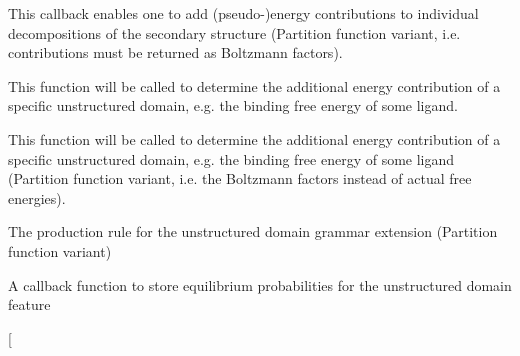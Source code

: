 \begin{DoxyRefList}
\item[\label{callbacks__callbacks000003}%
\Hypertarget{callbacks__callbacks000003}%
Global \mbox{\hyperlink{group__soft__constraints_ga4099978d410513edeeff8f3db13144c5}{vrna\+\_\+callback\+\_\+sc\+\_\+exp\+\_\+energy}} (int i, int j, int k, int l, unsigned char d, void $\ast$data)]This callback enables one to add (pseudo-\/)energy contributions to individual decompositions of the secondary structure (Partition function variant, i.\+e. contributions must be returned as Boltzmann factors).  
\item[\label{callbacks__callbacks000010}%
\Hypertarget{callbacks__callbacks000010}%
Global \mbox{\hyperlink{group__domains__up_ga75825c57d0bfde4ae4f95c044260c5c3}{vrna\+\_\+callback\+\_\+ud\+\_\+energy}} (vrna\+\_\+fold\+\_\+compound\+\_\+t $\ast$vc, int i, int j, unsigned int loop\+\_\+type, void $\ast$data)]This function will be called to determine the additional energy contribution of a specific unstructured domain, e.\+g. the binding free energy of some ligand.  
\item[\label{callbacks__callbacks000011}%
\Hypertarget{callbacks__callbacks000011}%
Global \mbox{\hyperlink{group__domains__up_ga861706f257ba993753464b823e65b86e}{vrna\+\_\+callback\+\_\+ud\+\_\+exp\+\_\+energy}} (vrna\+\_\+fold\+\_\+compound\+\_\+t $\ast$vc, int i, int j, unsigned int loop\+\_\+type, void $\ast$data)]This function will be called to determine the additional energy contribution of a specific unstructured domain, e.\+g. the binding free energy of some ligand (Partition function variant, i.\+e. the Boltzmann factors instead of actual free energies).  
\item[\label{callbacks__callbacks000013}%
\Hypertarget{callbacks__callbacks000013}%
Global \mbox{\hyperlink{group__domains__up_ga33d78327dcd04c1ca5ab2887edc18c7b}{vrna\+\_\+callback\+\_\+ud\+\_\+exp\+\_\+production}} (vrna\+\_\+fold\+\_\+compound\+\_\+t $\ast$vc, void $\ast$data)]The production rule for the unstructured domain grammar extension (Partition function variant)  
\item[\label{callbacks__callbacks000014}%
\Hypertarget{callbacks__callbacks000014}%
Global \mbox{\hyperlink{group__domains__up_gab10498abc84fcaf336aca8f8d7d42eb2}{vrna\+\_\+callback\+\_\+ud\+\_\+probs\+\_\+add}} (vrna\+\_\+fold\+\_\+compound\+\_\+t $\ast$vc, int i, int j, unsigned int loop\+\_\+type, F\+L\+T\+\_\+\+O\+R\+\_\+\+D\+BL exp\+\_\+energy, void $\ast$data)]A callback function to store equilibrium probabilities for the unstructured domain feature  
\item[\label{callbacks__callbacks000015}%

\end{DoxyRefList}
